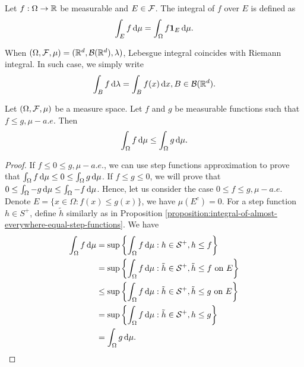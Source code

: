 \begin{definition}
  Let $f:\Omega\to\mathbb{R}$ be measurable and $E \in \mathcal{F}$. The integral of $f$ over $E$ is defined as
  \begin{equation}
    \int_E f\,\mathrm{d} \mu = \int_\Omega f\mathbf{1}_E\,\mathrm{d} \mu.
  \end{equation}
\end{definition}

\begin{remark}
  When $(\Omega, \mathcal{F}, \mu) = (\mathbb{R}^d, \mathcal{B}{(\mathbb{R}^d)}, \lambda)$, Lebesgue integral coincides with Riemann integral. In such case, we simply write
  \begin{equation}
    \int_B f\,\mathrm{d}\lambda = \int_B f(x)\,\mathrm{d} x, B\in\mathcal{B}(\mathbb{R}^d).
  \end{equation}
\end{remark}

\begin{proposition}
  \label{proposition:integral-of-le-everywhere-functions}
  Let $(\Omega,\mathcal{F},\mu)$ be a measure space. Let $f$ and $g$ be measurable functions such that $f\le g, \mu-a.e.$ Then
  \begin{equation}
    \int_\Omega f\,\mathrm{d} \mu \le  \int_\Omega g\,\mathrm{d} \mu.
  \end{equation}
\end{proposition}

\begin{proof}
  If $f\le 0  \le g, \mu-a.e.$, we can use step functions approximation to prove that $\int_\Omega f\,\mathrm{d} \mu \le 0 \le  \int_\Omega g\,\mathrm{d} \mu$. If $f\le g\le 0$, we will prove that $0\le \int_\Omega -g\,\mathrm{d} \mu \le \int_\Omega -f\,\mathrm{d} \mu$. Hence, let us consider the case $ 0  \le f\le  g, \mu-a.e.$ Denote $E = \{x\in \Omega : f(x) \le g(x)\}$, we have $\mu(E^c) = 0$. For a step function $h\in S^+$, define $\tilde{h}$ similarly as in Proposition  \ref{proposition:integral-of-almost-everywhere-equal-step-functions}. We have
  \begin{align*}
    \int_\Omega f\,\mathrm{d} \mu
     & = \sup\left\{\int_\Omega f\,\mathrm{d} \mu : h\in \mathcal{S}^+, h\le f\right\}                                  \\
     & = \sup\left\{\int_\Omega f\,\mathrm{d} \mu : \tilde{h}\in \mathcal{S}^+, \tilde{h}\le f \text{ on } E\right\}    \\
     & \le  \sup\left\{\int_\Omega f\,\mathrm{d} \mu : \tilde{h}\in \mathcal{S}^+, \tilde{h}\le g \text{ on } E\right\} \\
     & =  \sup\left\{\int_\Omega f\,\mathrm{d} \mu : \tilde{h}\in \mathcal{S}^+, h\le g\right\}                         \\
     & =  \int_\Omega g\,\mathrm{d} \mu.
  \end{align*}
\end{proof}

